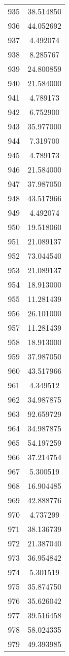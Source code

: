 \documentclass[12pt]{article}
\begin{document}
\begin{longtable}{@{}cc@{}}
935 & 38.514850 \\
936 & 44.052692 \\
937 & 4.492074 \\
938 & 8.285767 \\
939 & 24.800859 \\
940 & 21.584000 \\
941 & 4.789173 \\
942 & 6.752900 \\
943 & 35.977000 \\
944 & 7.319700 \\
945 & 4.789173 \\
946 & 21.584000 \\
947 & 37.987050 \\
948 & 43.517966 \\
949 & 4.492074 \\
950 & 19.518060 \\
951 & 21.089137 \\
952 & 73.044540 \\
953 & 21.089137 \\
954 & 18.913000 \\
955 & 11.281439 \\
956 & 26.101000 \\
957 & 11.281439 \\
958 & 18.913000 \\
959 & 37.987050 \\
960 & 43.517966 \\
961 & 4.349512 \\
962 & 34.987875 \\
963 & 92.659729 \\
964 & 34.987875 \\
965 & 54.197259 \\
966 & 37.214754 \\
967 & 5.300519 \\
968 & 16.904485 \\
969 & 42.888776 \\
970 & 4.737299 \\
971 & 38.136739 \\
972 & 21.387040 \\
973 & 36.954842 \\
974 & 5.301519 \\
975 & 35.874750 \\
976 & 35.626042 \\
977 & 39.516458 \\
978 & 58.024335 \\
979 & 49.393985 \\

\end{longtable}
\end{document}
